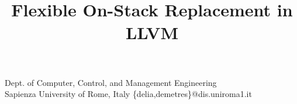 \documentclass[nocopyrightspace,10pt]{sigplanconf}
\begin{document}
\title{Flexible On-Stack Replacement in LLVM}

           {{\small Dept. of Computer, Control, and Management Engineering\\Sapienza University of Rome, Italy}} %
           {\{delia,demetres\}@dis.uniroma1.it} %

\maketitle


\newcommand{\separateAEdoc}{}


\end{document}

